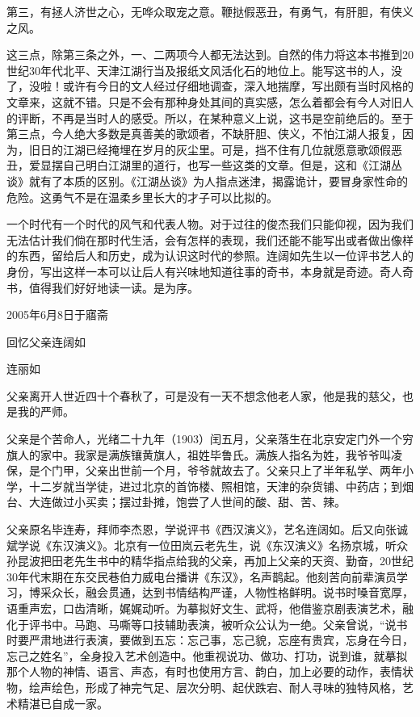 \documentclass[12pt,UTF8]{ctexbook}
\begin{document}
第三，有拯人济世之心，无哗众取宠之意。鞭挞假恶丑，有勇气，有肝胆，有侠义之风。

这三点，除第三条之外，一、二两项今人都无法达到。自然的伟力将这本书推到20世纪30年代北平、天津江湖行当及报纸文风活化石的地位上。能写这书的人，没了，没啦！或许有今日的文人经过仔细地调查，深入地揣摩，写出颇有当时风格的文章来，这就不错。只是不会有那种身处其间的真实感，怎么着都会有今人对旧人的评断，不再是当时人的感受。所以，在某种意义上说，这书是空前绝后的。至于第三点，今人绝大多数是真善美的歌颂者，不缺肝胆、侠义，不怕江湖人报复，因为，旧日的江湖已经掩埋在岁月的灰尘里。可是，挡不住有几位就愿意歌颂假恶丑，爱显摆自己明白江湖里的道行，也写一些这类的文章。但是，这和《江湖丛谈》就有了本质的区别。《江湖丛谈》为人指点迷津，揭露诡计，要冒身家性命的危险。这勇气不是在温柔乡里长大的才子可以比拟的。

一个时代有一个时代的风气和代表人物。对于过往的俊杰我们只能仰视，因为我们无法估计我们倘在那时代生活，会有怎样的表现，我们还能不能写出或者做出像样的东西，留给后人和历史，成为认识这时代的参照。连阔如先生以一位评书艺人的身份，写出这样一本可以让后人有兴味地知道往事的奇书，本身就是奇迹。奇人奇书，值得我们好好地读一读。是为序。

2005年6月8日于寤斋





回忆父亲连阔如


连丽如

父亲离开人世近四十个春秋了，可是没有一天不想念他老人家，他是我的慈父，也是我的严师。

父亲是个苦命人，光绪二十九年（1903）闰五月，父亲落生在北京安定门外一个穷旗人的家中。我家是满族镶黄旗人，祖姓毕鲁氏。满族人指名为姓，我爷爷叫凌保，是个门甲，父亲出世前一个月，爷爷就故去了。父亲只上了半年私学、两年小学，十二岁就当学徒，进过北京的首饰楼、照相馆，天津的杂货铺、中药店；到烟台、大连做过小买卖；摆过卦摊，饱尝了人世间的酸、甜、苦、辣。

父亲原名毕连寿，拜师李杰恩，学说评书《西汉演义》，艺名连阔如。后又向张诚斌学说《东汉演义》。北京有一位田岚云老先生，说《东汉演义》名扬京城，听众孙昆波把田老先生书中的精华指点给我的父亲，再加上父亲的天资、勤奋，20世纪30年代末期在东交民巷伯力威电台播讲《东汉》，名声鹊起。他刻苦向前辈演员学习，博采众长，融会贯通，达到书情结构严谨，人物性格鲜明。说书时嗓音宽厚，语重声宏，口齿清晰，娓娓动听。为摹拟好文生、武将，他借鉴京剧表演艺术，融化于评书中。马跑、马嘶等口技辅助表演，被听众公认为一绝。父亲曾说，“说书时要严肃地进行表演，要做到五忘：忘己事，忘己貌，忘座有贵宾，忘身在今日，忘己之姓名”，全身投入艺术创造中。他重视说功、做功、打功，说到谁，就摹拟那个人物的神情、语言、声态，有时也使用方言、韵白，加上必要的动作，表情状物，绘声绘色，形成了神完气足、层次分明、起伏跌宕、耐人寻味的独特风格，艺术精湛已自成一家。
\end{document}
